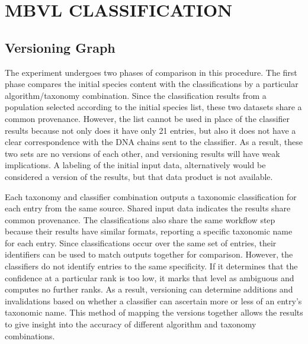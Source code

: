 
\chapter{MBVL CLASSIFICATION}

\section{Versioning Graph}

The experiment undergoes two phases of comparison in this procedure.
The first phase compares the initial species content with the classifications by a particular algorithm/taxonomy combination.
Since the classification results from a population selected according to the initial species list, these two datasets share a common provenance.
However, the list cannot be used in place of the classifier results because not only does it have only 21 entries, but also it does not have a clear correspondence with the DNA chains sent to the classifier.
As a result, these two sets are no versions of each other, and versioning results will have weak implications.
A labeling of the initial input data, alternatively would be considered a version of the results, but that data product is not available.

Each taxonomy and classifier combination outputs a taxonomic classification for each entry from the same source.
Shared input data indicates the results share common provenance.
The classifications also share the same workflow step because their results have similar formats, reporting a specific taxonomic name for each entry.
Since classifications occur over the same set of entries, their identifiers can be used to match outputs together for comparison.
However, the classifiers do not identify entries to the same specificity.
If it determines that the confidence at a particular rank is too low, it marks that level as ambiguous and computes no further ranks.
As a result, versioning can determine additions and invalidations based on whether a classifier can ascertain more or less of an entry's taxonomic name.
This method of mapping the versions together allows the results to give insight into the accuracy of different algorithm and taxonomy combinations.


